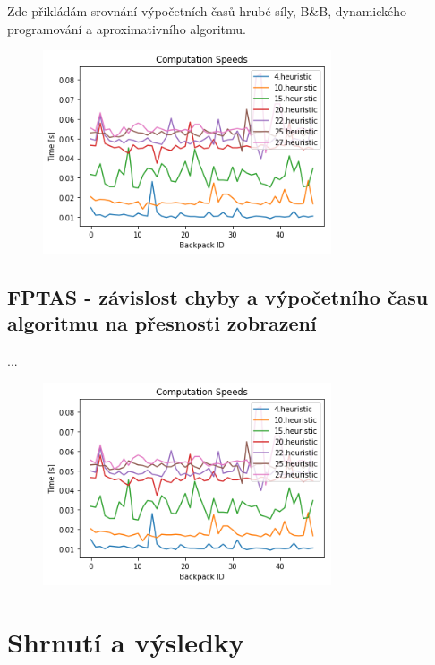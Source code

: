 \documentclass[a4paper,10pt,twocolumn]{article}
\begin{document}
Zde přikládám srovnání výpočetních časů hrubé síly, B\&B, dynamického programování a aproximativního algoritmu.

\begin{figure}[H]
  \begin{center}
    \includegraphics[height=6cm]{graphs/heuristic_speeds.png}
  \end{center}
\end{figure}




\subsection{FPTAS - závislost chyby a výpočetního času algoritmu na přesnosti zobrazení}

...


\begin{figure}[H]
  \begin{center}
    \includegraphics[height=6cm]{graphs/heuristic_speeds.png}
  \end{center}
\end{figure}



\section{Shrnutí a výsledky}
\end{document}

